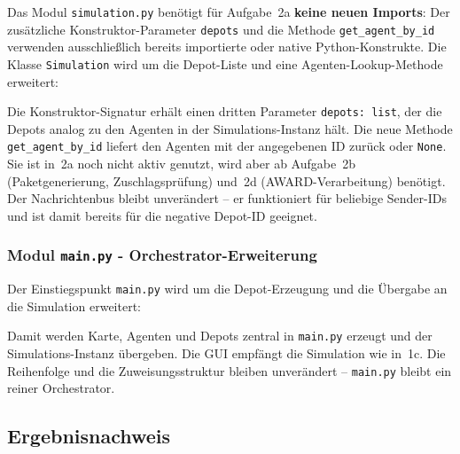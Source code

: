 Das Modul \texttt{simulation.py} benötigt für Aufgabe~2a \textbf{keine neuen Imports}: Der zusätzliche Konstruktor-Parameter \texttt{depots} und die Methode \texttt{get\_agent\_by\_id} verwenden ausschließlich bereits importierte oder native Python-Konstrukte.
Die Klasse \texttt{Simulation} wird um die Depot-Liste und eine Agenten-Lookup-Methode erweitert:



Die Konstruktor-Signatur erhält einen dritten Parameter \texttt{depots: list}, der die Depots analog zu den Agenten in der Simulations-Instanz hält. Die neue Methode \texttt{get\_agent\_by\_id} liefert den Agenten mit der angegebenen ID zurück oder \texttt{None}. Sie ist in~2a noch nicht aktiv genutzt, wird aber ab Aufgabe~2b (Paketgenerierung, Zuschlagsprüfung) und~2d (AWARD-Verarbeitung) benötigt. Der Nachrichtenbus bleibt unverändert -- er funktioniert für beliebige Sender-IDs und ist damit bereits für die negative Depot-ID geeignet.


\subsubsection{Modul \texttt{main.py} - Orchestrator-Erweiterung}

Der Einstiegspunkt \texttt{main.py} wird um die Depot-Erzeugung und die Übergabe an die Simulation erweitert:



Damit werden Karte, Agenten und Depots zentral in \texttt{main.py} erzeugt und der Simulations-Instanz übergeben. Die GUI empfängt die Simulation wie in~1c. Die Reihenfolge und die Zuweisungsstruktur bleiben unverändert -- \texttt{main.py} bleibt ein reiner Orchestrator.


\subsection{Ergebnisnachweis}
\label{sssec:kommunikation_2a_nachweis}

